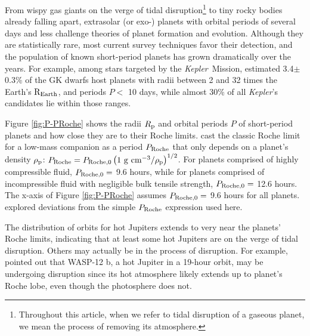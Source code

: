 \documentclass{svjour3}                     %
\newcommand{\kepler}{\emph{Kepler}}
\begin{document}
From wispy gas giants on the verge of tidal disruption\footnote{Throughout this article, when we refer to tidal disruption of a gaseous planet, we mean the process of removing its atmosphere.} to tiny rocky bodies already falling apart, extrasolar (or exo-) planets with orbital periods of several days and less challenge theories of planet formation and evolution. Although they are statistically rare, most current survey techniques favor their detection, and the population of known short-period planets has grown dramatically over the years. For example, among stars targeted by the \kepler\ Mission, \cite{Howard2010Occurrence} estimated 3.4$\pm$0.3\% of the GK dwarfs host planets with radii between 2 and 32 times the Earth's ${\rm R_{Earth}}$, and periods $P <$ 10 days, while almost 30\% of all \kepler's candidates lie within those ranges. 

Figure \ref{fig:P-PRoche} shows the radii $R_{\rm p}$ and orbital periods $P$ of short-period planets and how close they are to their Roche limits. \cite{Rappaport2013Roche} cast the classic Roche limit for a low-mass companion as a period $P_{\rm Roche}$ that only depends on a planet's density $\rho_{\rm p}$: $P_{\rm Roche} = P_{\rm Roche, 0} \left( 1\ {\rm g\ cm^{-3}} / \rho_{\rm p} \right)^{1/2}$. For planets comprised of highly compressible fluid, $P_{\rm Roche, 0} =$ 9.6 hours, while for planets comprised of incompressible fluid with negligible bulk tensile strength, $P_{\rm Roche, 0} =$ 12.6 hours. The x-axis of Figure \ref{fig:P-PRoche} assumes $P_{\rm Roche, 0} =$ 9.6 hours for all planets. \cite{Rappaport2013Roche} explored deviations from the simple $P_{\rm Roche}$ expression used here. 

The distribution of orbits for hot Jupiters extends to very near the planets' Roche limits, indicating that at least some hot Jupiters are on the verge of tidal disruption. Others may actually be in the process of disruption. For example, \cite{2010Natur.463.1054L} pointed out that WASP-12 b, a hot Jupiter in a 19-hour orbit, may be undergoing disruption since its hot atmosphere likely extends up to planet's Roche lobe, even though the photosphere does not. 
\end{document}
